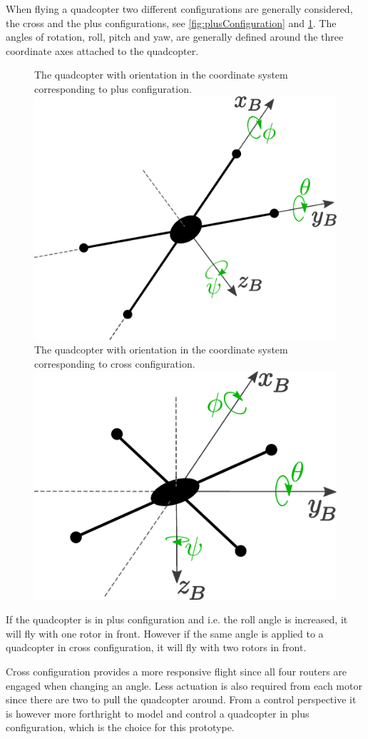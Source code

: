 When flying a quadcopter two different configurations are generally considered, the cross and the plus configurations, see \autoref{fig:plusConfiguration} and \ref{fig:crossConfiguration}. The angles of rotation, roll, pitch and yaw, are generally defined around the three coordinate axes attached to the quadcopter. \cite{HLChan}
%
\begin{figure}[H]
  \centering
  \captionbox
  {
    The quadcopter with orientation in the coordinate system corresponding to plus configuration.
    \label{fig:plusConfiguration}
  }
  {
    \includegraphics[width=.42\textwidth]{figures/plusConfiguration}
  }
  \hspace{5pt}
  \captionbox
  {
    The quadcopter with orientation in the coordinate system corresponding to cross configuration.
    \label{fig:crossConfiguration}
  }
  {
    \includegraphics[width=.40\textwidth]{figures/crossConfiguration}
    \vspace{.5cm}
  }
\end{figure}
%
If the quadcopter is in plus configuration and i.e. the roll angle is increased, it will fly with one rotor in front. However if the same angle is applied to a quadcopter in cross configuration, it will fly with two rotors in front. \cite{HLChan}

Cross configuration provides a more responsive flight since all four routers are engaged when changing an angle. Less actuation is also required from each motor since there are two to pull the quadcopter around. From a control perspective it is however more forthright to model and control a quadcopter in plus configuration, which is the choice for this prototype. \cite{HLChan}

